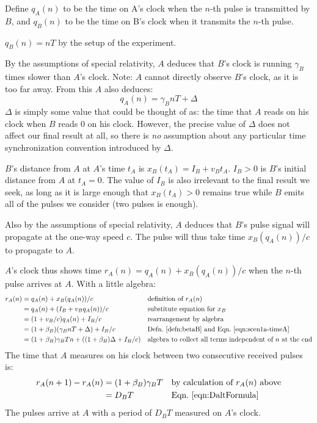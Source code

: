 \documentclass[a4paper]{article}
\theoremstyle{plain}
\theoremstyle{definition}
\begin{document}
Define $q_A(n)$ to be the time on A's clock when the $n$-th pulse is
transmitted by $B$, and $q_B(n)$ to be the time on B's clock when it
transmits the $n$-th pulse.

$q_B(n) = nT$ by the setup of the experiment.

By the assumptions of special relativity, $A$ deduces that $B$'s clock
is running $\gamma_B$ times slower than $A$'s clock.  Note: $A$ cannot
directly observe $B$'s clock, as it is too far away.  From this $A$
also deduces:
\begin{equation}
q_A(n) = \gamma_B nT + \Delta  \label{eqn:scen1a-timeA}
\end{equation}
$\Delta$ is simply some value that could be thought of as: the time
that $A$ reads on his clock when $B$ reads 0 on his clock.  However,
the precise value of $\Delta$ does not affect our final result at all,
so there is {\em no} assumption about any particular time
synchronization convention introduced by $\Delta$.

$B$'s distance from $A$ at $A$'s time $t_A$ is
$x_B(t_A) = I_B + v_B t_A$.
$I_B > 0$ is $B$'s initial distance from $A$ at $t_A=0$.
The value of $I_B$ is also irrelevant to the final result we seek,
as long as it is large enough that $x_B(t_A) > 0$ remains
true while $B$ emits all of the pulses we consider (two pulses is enough).

Also by the assumptions of special relativity, $A$ deduces that $B$'s
pulse signal will propagate at the one-way speed $c$.  The pulse will
thus take time $x_B(q_A(n))/c$ to propagate to $A$.

$A$'s clock thus shows time $r_A(n) = q_A(n) + x_B(q_A(n))/c$ when the $n$-th
pulse arrives at $A$.  With a little algebra:
\begin{align*}
r_A(n)
  & = q_A(n) + x_B(q_A(n))/c & & \text{definition of $r_A(n)$} \\
  & = q_A(n) + (I_B + v_B q_A(n))/c & & \text{substitute equation for $x_B$} \\
  & = (1 + v_B/c) q_A(n) + I_B/c & & \text{rearrangement by algebra} \\
  & = (1 + \beta_B) (\gamma_B nT + \Delta) + I_B/c & & \text{Defn.~\eqref{defn:betaB} and Eqn.~\eqref{eqn:scen1a-timeA}} \\
  & = (1 + \beta_B) \gamma_B Tn + ((1 + \beta_B) \Delta + I_B/c) & & \text{algebra to collect all terms independent of $n$ at the end}
\end{align*}
The time that $A$ measures on his clock between two consecutive received
pulses is:
\begin{align*}
r_A(n+1) - r_A(n)
  & = (1 + \beta_B) \gamma_B T & & \text{by calculation of $r_A(n)$ above} \\
  & = D_B T & & \text{Eqn.~\eqref{eqn:DaltFormula}}
\end{align*}
The pulses arrive at $A$ with a period of $D_B T$ measured on $A$'s clock.
\end{document}
